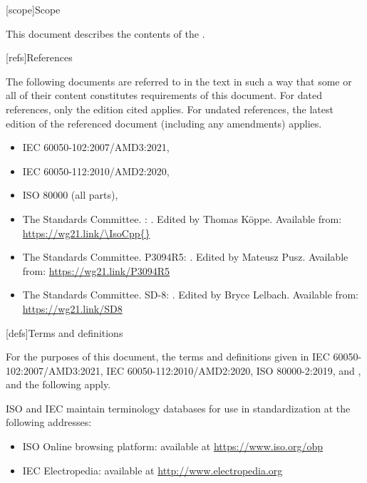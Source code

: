 

[scope]{Scope}

\pnum
{}%
This document describes the contents of the .


[refs]{References}

\pnum
{}%
The following documents are referred to in the text
in such a way that some or all of their content
constitutes requirements of this document.
For dated references, only the edition cited applies.
For undated references,
the latest edition of the referenced document
(including any amendments) applies.
\begin{itemize}
\item
IEC 60050-102:2007/AMD3:2021,
\item
IEC 60050-112:2010/AMD2:2020,
\item
ISO 80000 (all parts), 
\item
The \Cpp{} Standards Committee.
\IsoCpp{}: .
Edited by Thomas K\"{o}ppe.
Available from: \url{https://wg21.link/\IsoCpp{}}
\item
The \Cpp{} Standards Committee.
P3094R5: .
Edited by Mateusz Pusz.
Available from: \url{https://wg21.link/P3094R5}
\item
The \Cpp{} Standards Committee.
SD-8: .
Edited by Bryce Lelbach.
Available from: \url{https://wg21.link/SD8}
\end{itemize}


[defs]{Terms and definitions}

\pnum
{}%
For the purposes of this document,
the terms and definitions given in
IEC 60050-102:2007/AMD3:2021,
IEC 60050-112:2010/AMD2:2020,
ISO 80000-2:2019,
and
\IsoCpp{},
and the following apply.

\pnum
ISO and IEC maintain terminology databases
for use in standardization
at the following addresses:
\begin{itemize}
\item ISO Online browsing platform: available at \url{https://www.iso.org/obp}
\item IEC Electropedia: available at \url{http://www.electropedia.org}
\end{itemize}


